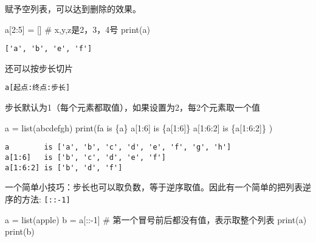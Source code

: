 \documentclass[
  letterpaper,
  DIV=11,
  numbers=noendperiod]{scrreprt}
\newenvironment{Shaded}{\begin{snugshade}}{\end{snugshade}}
\newcommand{\BuiltInTok}[1]{\textcolor[rgb]{0.00,0.23,0.31}{#1}}
\newcommand{\CommentTok}[1]{\textcolor[rgb]{0.37,0.37,0.37}{#1}}
\newcommand{\DecValTok}[1]{\textcolor[rgb]{0.68,0.00,0.00}{#1}}
\newcommand{\NormalTok}[1]{\textcolor[rgb]{0.00,0.23,0.31}{#1}}
\newcommand{\OperatorTok}[1]{\textcolor[rgb]{0.37,0.37,0.37}{#1}}
\newcommand{\SpecialCharTok}[1]{\textcolor[rgb]{0.37,0.37,0.37}{#1}}
\newcommand{\SpecialStringTok}[1]{\textcolor[rgb]{0.13,0.47,0.30}{#1}}
\newcommand{\StringTok}[1]{\textcolor[rgb]{0.13,0.47,0.30}{#1}}
\begin{document}
赋予空列表，可以达到删除的效果。

\begin{Shaded}
\begin{Highlighting}[]
\NormalTok{a[}\DecValTok{2}\NormalTok{:}\DecValTok{5}\NormalTok{] }\OperatorTok{=}\NormalTok{ [] }\CommentTok{\# x,y,z是2，3，4号}
\BuiltInTok{print}\NormalTok{(a)}
\end{Highlighting}
\end{Shaded}

\begin{verbatim}
['a', 'b', 'e', 'f']
\end{verbatim}

还可以按步长切片

\texttt{a{[}起点:终点:步长{]}}

步长默认为1（每个元素都取值），如果设置为2，每2个元素取一个值

\begin{Shaded}
\begin{Highlighting}[]
\NormalTok{a }\OperatorTok{=} \BuiltInTok{list}\NormalTok{(}\StringTok{\textquotesingle{}abcdefgh\textquotesingle{}}\NormalTok{)}
\BuiltInTok{print}\NormalTok{(}\SpecialStringTok{f\textquotesingle{}\textquotesingle{}\textquotesingle{}a        is }\SpecialCharTok{\{}\NormalTok{a}\SpecialCharTok{\}}
\SpecialStringTok{a[1:6]   is }\SpecialCharTok{\{}\NormalTok{a[}\DecValTok{1}\NormalTok{:}\DecValTok{6}\NormalTok{]}\SpecialCharTok{\}}
\SpecialStringTok{a[1:6:2] is }\SpecialCharTok{\{}\NormalTok{a[}\DecValTok{1}\NormalTok{:}\DecValTok{6}\NormalTok{:}\DecValTok{2}\NormalTok{]}\SpecialCharTok{\}}
\SpecialStringTok{\textquotesingle{}\textquotesingle{}\textquotesingle{}}\NormalTok{)}
\end{Highlighting}
\end{Shaded}

\begin{verbatim}
a        is ['a', 'b', 'c', 'd', 'e', 'f', 'g', 'h']
a[1:6]   is ['b', 'c', 'd', 'e', 'f']
a[1:6:2] is ['b', 'd', 'f']
\end{verbatim}

一个简单小技巧：步长也可以取负数，等于逆序取值。因此有一个简单的把列表逆序的方法:
\texttt{{[}::-1{]}}

\begin{Shaded}
\begin{Highlighting}[]
\NormalTok{a }\OperatorTok{=} \BuiltInTok{list}\NormalTok{(}\StringTok{\textquotesingle{}apple\textquotesingle{}}\NormalTok{)}
\NormalTok{b }\OperatorTok{=}\NormalTok{ a[::}\OperatorTok{{-}}\DecValTok{1}\NormalTok{] }\CommentTok{\# 第一个冒号前后都没有值，表示取整个列表}
\BuiltInTok{print}\NormalTok{(a)}
\BuiltInTok{print}\NormalTok{(b)}
\end{Highlighting}
\end{Shaded}
\end{document}
